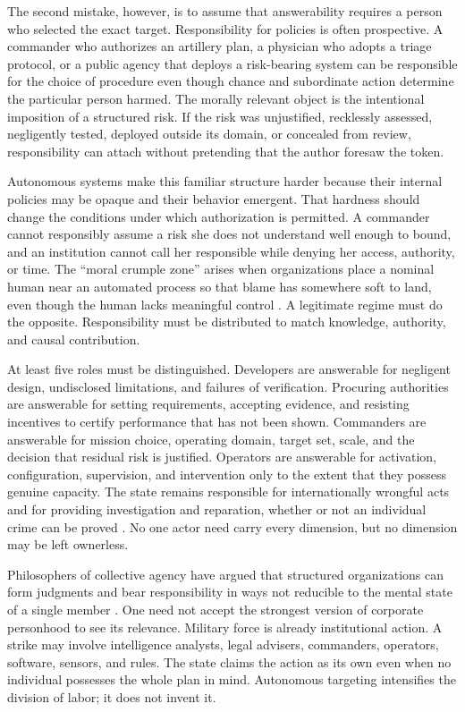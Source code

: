 \documentclass[11pt]{article}
\begin{document}
The second mistake, however, is to assume that answerability requires a person who selected the exact target. Responsibility for policies is often prospective. A commander who authorizes an artillery plan, a physician who adopts a triage protocol, or a public agency that deploys a risk-bearing system can be responsible for the choice of procedure even though chance and subordinate action determine the particular person harmed. The morally relevant object is the intentional imposition of a structured risk. If the risk was unjustified, recklessly assessed, negligently tested, deployed outside its domain, or concealed from review, responsibility can attach without pretending that the author foresaw the token.

Autonomous systems make this familiar structure harder because their internal policies may be opaque and their behavior emergent. That hardness should change the conditions under which authorization is permitted. A commander cannot responsibly assume a risk she does not understand well enough to bound, and an institution cannot call her responsible while denying her access, authority, or time. The ``moral crumple zone'' arises when organizations place a nominal human near an automated process so that blame has somewhere soft to land, even though the human lacks meaningful control \citep{elish2019}. A legitimate regime must do the opposite. Responsibility must be distributed to match knowledge, authority, and causal contribution.

At least five roles must be distinguished. Developers are answerable for negligent design, undisclosed limitations, and failures of verification. Procuring authorities are answerable for setting requirements, accepting evidence, and resisting incentives to certify performance that has not been shown. Commanders are answerable for mission choice, operating domain, target set, scale, and the decision that residual risk is justified. Operators are answerable for activation, configuration, supervision, and intervention only to the extent that they possess genuine capacity. The state remains responsible for internationally wrongful acts and for providing investigation and reparation, whether or not an individual crime can be proved \citep{ilc2001}. No one actor need carry every dimension, but no dimension may be left ownerless.

Philosophers of collective agency have argued that structured organizations can form judgments and bear responsibility in ways not reducible to the mental state of a single member \citep{pettit2007, listpettit2011}. One need not accept the strongest version of corporate personhood to see its relevance. Military force is already institutional action. A strike may involve intelligence analysts, legal advisers, commanders, operators, software, sensors, and rules. The state claims the action as its own even when no individual possesses the whole plan in mind. Autonomous targeting intensifies the division of labor; it does not invent it.
\end{document}
